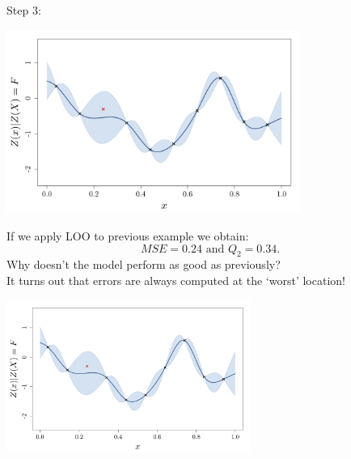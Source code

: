 \documentclass{beamer}
\begin{document}
\begin{frame}{}
Step 3:\\ \vspace{3mm}
\begin{center}
\includegraphics[height=6cm]{figures/R/VALID_crossval3}
\end{center}
\end{frame}

\begin{frame}{}
If we apply LOO to previous example we obtain:
 $$MSE = 0.24 \text{ and } Q_2 = 0.34.$$
Why doesn't the model perform as good as previously?\\
\vspace{5mm}
\pause
It turns out that errors are always computed at the `worst' location!
\begin{center}
\includegraphics[height=5cm]{figures/R/VALID_crossval3}
\end{center}
\end{frame}
\end{document}
